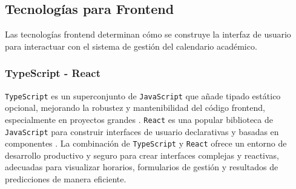 \subsection{Tecnologías para Frontend}
Las tecnologías frontend determinan cómo se construye la interfaz de usuario para interactuar con el sistema de gestión del calendario académico.

\subsubsection{TypeScript - React}
\texttt{TypeScript} es un superconjunto de \texttt{JavaScript} que añade tipado estático opcional, mejorando la robustez y mantenibilidad del código frontend, especialmente en proyectos grandes \parencite{MicrosoftTypeScript}. \texttt{React} es una popular biblioteca de \texttt{JavaScript} para construir interfaces de usuario declarativas y basadas en componentes \parencite{FacebookReact}.
La combinación de \texttt{TypeScript} y \texttt{React} ofrece un entorno de desarrollo productivo y seguro para crear interfaces complejas y reactivas, adecuadas para visualizar horarios, formularios de gestión y resultados de predicciones de manera eficiente.
